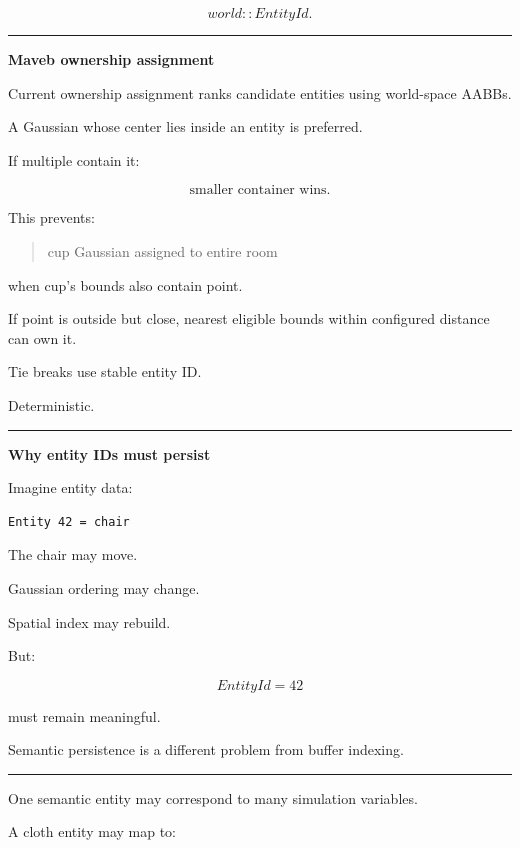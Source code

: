 \[
world::EntityId.
\]

\begin{center}\rule{0.5\linewidth}{0.5pt}\end{center}

\textbf{Maveb ownership assignment}

Current ownership assignment ranks candidate entities using world-space AABBs.

A Gaussian whose center lies inside an entity is preferred.

If multiple contain it:

\[
\boxed{
\text{smaller container wins}.
}
\]

This prevents:

\begin{quote}
cup Gaussian assigned to entire room
\end{quote}

when cup's bounds also contain point.

If point is outside but close, nearest eligible bounds within configured distance can own it.

Tie breaks use stable entity ID.

Deterministic.

\begin{center}\rule{0.5\linewidth}{0.5pt}\end{center}

\textbf{Why entity IDs must persist}

Imagine entity data:

\protect{}\label{7x0yqd}%
\begin{verbatim}
Entity 42 = chair
\end{verbatim}

The chair may move.

Gaussian ordering may change.

Spatial index may rebuild.

But:

\[
EntityId=42
\]

must remain meaningful.

Semantic persistence is a different problem from buffer indexing.

\begin{center}\rule{0.5\linewidth}{0.5pt}\end{center}

One semantic entity may correspond to many simulation variables.

A cloth entity may map to:

